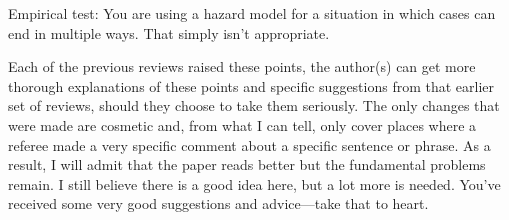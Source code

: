 Empirical test: You are using a hazard model for a situation in which cases can end in multiple ways.  That simply isn’t appropriate.

Each of the previous reviews raised these points, the author(s) can get more thorough explanations of these points and specific suggestions from that earlier set of reviews, should they choose to take them seriously.  The only changes that were made are cosmetic and, from what I can tell, only cover places where a referee made a very specific comment about a specific sentence or phrase.  As a result, I will admit that the paper reads better but the fundamental problems remain.  I still believe there is a good idea here, but a lot more is needed.  You’ve received some very good suggestions and advice—take that to heart.